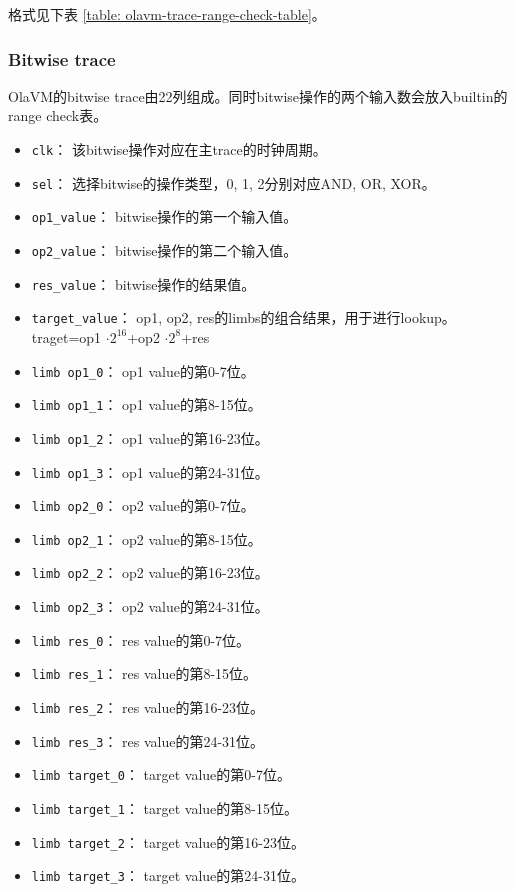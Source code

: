 格式见下表 \ref{table: olavm-trace-range-check-table}。

\begin{table}[!ht]
    \centering {}
    \caption{OlaVM的range check的trace表结构}
    \label{table: olavm-trace-range-check-table}
\end{table}

\subsubsection{Bitwise trace}\label{subsubsec: olavm-bitwise-trace}
OlaVM的bitwise trace由22列组成。同时bitwise操作的两个输入数会放入builtin的range check表。
\begin{itemize}
    \item \verb|clk|： 该bitwise操作对应在主trace的时钟周期。
    \item \verb|sel|： 选择bitwise的操作类型，0, 1, 2分别对应AND, OR, XOR。
    \item \verb|op1_value|： bitwise操作的第一个输入值。
    \item \verb|op2_value|： bitwise操作的第二个输入值。
    \item \verb|res_value|： bitwise操作的结果值。
    \item \verb|target_value|： op1, op2, res的limbs的组合结果，用于进行lookup。traget=op1 $\cdot 2^{16}$+op2 $\cdot 2^8$+res
    \item \verb|limb op1_0|： op1 value的第0-7位。
    \item \verb|limb op1_1|： op1 value的第8-15位。
    \item \verb|limb op1_2|： op1 value的第16-23位。
    \item \verb|limb op1_3|： op1 value的第24-31位。
    \item \verb|limb op2_0|： op2 value的第0-7位。
    \item \verb|limb op2_1|： op2 value的第8-15位。
    \item \verb|limb op2_2|： op2 value的第16-23位。
    \item \verb|limb op2_3|： op2 value的第24-31位。
    \item \verb|limb res_0|： res value的第0-7位。
    \item \verb|limb res_1|： res value的第8-15位。
    \item \verb|limb res_2|： res value的第16-23位。
    \item \verb|limb res_3|： res value的第24-31位。
    \item \verb|limb target_0|： target value的第0-7位。
    \item \verb|limb target_1|： target value的第8-15位。
    \item \verb|limb target_2|： target value的第16-23位。
    \item \verb|limb target_3|： target value的第24-31位。
\end{itemize}

